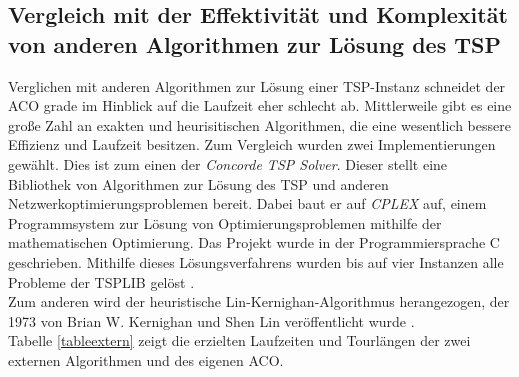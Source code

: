 \documentclass[doktyp=barbeit, sprache=german]{TUBAFarbeiten}
\begin{document}
\subsection{Vergleich mit der Effektivität und Komplexität von anderen Algorithmen zur Lösung des TSP}
Verglichen mit anderen Algorithmen zur Lösung einer TSP-Instanz schneidet der ACO grade im Hinblick auf die Laufzeit eher schlecht ab. Mittlerweile gibt es eine große Zahl an exakten und heurisitischen Algorithmen, die eine wesentlich bessere Effizienz und Laufzeit besitzen. Zum Vergleich wurden zwei Implementierungen gewählt. Dies ist zum einen der \textit{Concorde TSP Solver}. Dieser stellt eine Bibliothek von Algorithmen zur Lösung des TSP und anderen Netzwerkoptimierungsproblemen bereit. Dabei baut er auf \textit{CPLEX} auf, einem Programmsystem zur Lösung von Optimierungsproblemen mithilfe der mathematischen Optimierung. Das Projekt wurde in der Programmiersprache C geschrieben. Mithilfe dieses Lösungsverfahrens wurden bis auf vier Instanzen alle Probleme der TSPLIB gelöst \cite{Concorde}.
\\Zum anderen wird der heuristische Lin-Kernighan-Algorithmus herangezogen, der 1973 von Brian W. Kernighan und Shen Lin veröffentlicht wurde \cite{TSP}.
\\Tabelle \ref{tableextern} zeigt die erzielten Laufzeiten und Tourlängen der zwei externen Algorithmen und des eigenen ACO.
\end{document}
